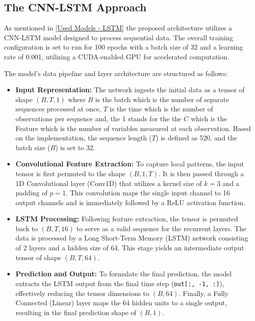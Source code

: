 \documentclass[conference]{IEEEtran}
\begin{document}
\subsection{The CNN-LSTM Approach}

As mentioned in \ref{Used Models - LSTM} the proposed architecture utilizes a CNN-LSTM model designed to process sequential data. The overall training configuration is set to run for 100 epochs with a batch size of 32 and a learning rate of 0.001, utilizing a CUDA-enabled GPU for accelerated computation.

The model's data pipeline and layer architecture are structured as follows:

\begin{itemize}
    \item \textbf{Input Representation:} The network ingests the initial data as a tensor of shape $(B, T, 1)$ where $B$ is the batch which is the number of separate sequences processed at once, $T$ is the time which is the number of observations per sequence and, the 1 stands for the the $C$ which is the Feature which is the number of variables measured at each observation. Based on the implementation, the sequence length ($T$) is defined as 520, and the batch size ($B$) is set to 32.
    \item \textbf{Convolutional Feature Extraction:} To capture local patterns, the input tensor is first permuted to the shape $(B, 1, T)$. It is then passed through a 1D Convolutional layer (Conv1D) that utilizes a kernel size of $k=3$ and a padding of $p=1$. This convolution maps the single input channel to 16 output channels and is immediately followed by a ReLU activation function.
    \item \textbf{LSTM Processing:} Following feature extraction, the tensor is permuted back to $(B, T, 16)$ to serve as a valid sequence for the recurrent layers. The data is processed by a Long Short-Term Memory (LSTM) network consisting of 2 layers and a hidden size of 64. This stage yields an intermediate output tensor of shape $(B, T, 64)$.
    \item \textbf{Prediction and Output:} To formulate the final prediction, the model extracts the LSTM output from the final time step (\texttt{out[:, -1, :]}), effectively reducing the tensor dimensions to $(B, 64)$. Finally, a Fully Connected (Linear) layer maps the 64 hidden units to a single output, resulting in the final prediction shape of $(B, 1)$.
\end{itemize}
\end{document}
